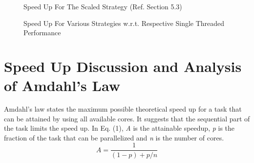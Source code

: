 \documentclass[a4paper,10pt,twoside]{article}
\begin{document}
\begin{figure}[t]
	\centering
	\caption{Speed Up For The Scaled Strategy (Ref. Section 5.3)}
	\label{fig:ualloc}
\end{figure}

\begin{figure}[t]
	\centering
	\caption{Speed Up For Various Strategies w.r.t. Respective Single Threaded Performance}
	\label{fig:ualloc}
\end{figure}


\section{Speed Up Discussion and Analysis of Amdahl's Law}
Amdahl's law states the maximum possible theoretical speed up for a task that can be attained by using all available cores. It suggests that the sequential part of the task limits the speed up. In Eq. (1), \textit{A} is the attainable speedup, \textit{p} is the fraction of the task that can be parallelized and \textit{n} is the number of cores. 
\begin{equation}
	A = \frac{1}{(1-p) + p/n}
\end{equation}
\end{document}
